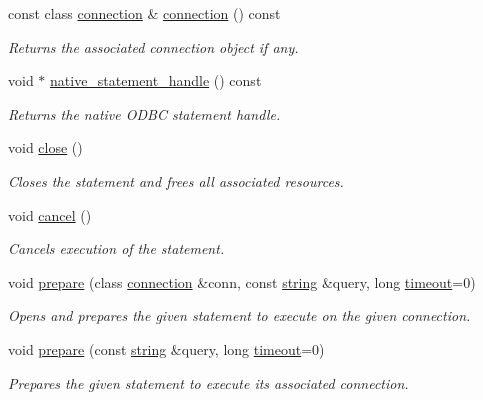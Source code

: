 \begin{DoxyCompactItemize}
const class \mbox{\hyperlink{classnanodbc_1_1connection}{connection}} \& \mbox{\hyperlink{classnanodbc_1_1statement_ae2e4f53a94056c5280fc5919c7bf5086}{connection}} () const
\begin{DoxyCompactList}\small\item\em Returns the associated connection object if any. \end{DoxyCompactList}\item 
void $\ast$ \mbox{\hyperlink{classnanodbc_1_1statement_a3698e721741be20dac1f933ed425c8d7}{native\+\_\+statement\+\_\+handle}} () const
\begin{DoxyCompactList}\small\item\em Returns the native O\+D\+BC statement handle. \end{DoxyCompactList}\item 
void \mbox{\hyperlink{classnanodbc_1_1statement_abcf1dda8ab40a3b8ebd33c69afa4a399}{close}} ()
\begin{DoxyCompactList}\small\item\em Closes the statement and frees all associated resources. \end{DoxyCompactList}\item 
void \mbox{\hyperlink{classnanodbc_1_1statement_a81f6e6e0b547a900d20652fe5abe7b75}{cancel}} ()
\begin{DoxyCompactList}\small\item\em Cancels execution of the statement. \end{DoxyCompactList}\item 
void \mbox{\hyperlink{classnanodbc_1_1statement_a63b56d30a303014ce8f80df5e5b67dca}{prepare}} (class \mbox{\hyperlink{classnanodbc_1_1connection}{connection}} \&conn, const \mbox{\hyperlink{namespacenanodbc_abfc0ece56278e590911ec8352774c212}{string}} \&query, long \mbox{\hyperlink{classnanodbc_1_1statement_adbd1acbbdcc529dc668bfef341593573}{timeout}}=0)
\begin{DoxyCompactList}\small\item\em Opens and prepares the given statement to execute on the given connection. \end{DoxyCompactList}\item 
void \mbox{\hyperlink{classnanodbc_1_1statement_a811a7bdbdea77b59af4aed8eddbc6840}{prepare}} (const \mbox{\hyperlink{namespacenanodbc_abfc0ece56278e590911ec8352774c212}{string}} \&query, long \mbox{\hyperlink{classnanodbc_1_1statement_adbd1acbbdcc529dc668bfef341593573}{timeout}}=0)
\begin{DoxyCompactList}\small\item\em Prepares the given statement to execute its associated connection. \end{DoxyCompactList}\item 

\end{DoxyCompactItemize}
